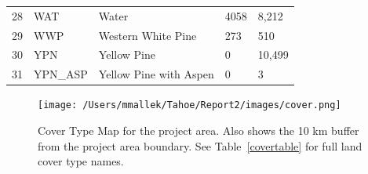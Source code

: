 \begin{table}[!htbp]
\begin{tabular}{@{}lllll@{}}
28                                                          & WAT                                                                & Water                                        & 4058  		                                              & 8,212                                                      \\
\rowcolor[HTML]{CAD6BA} 
29                                                          & WWP                                                                & Western White Pine                           & 273   		                                              & 510                                                        \\
30                                                          & YPN                                                                & Yellow Pine                                  & 0     		                                              & 10,499                                                     \\
\rowcolor[HTML]{CAD6BA} 
31                                                          & YPN\_ASP                                                           & Yellow Pine with Aspen                       & 0     		                                              & 3                                                          \\ \bottomrule
\end{tabular}
\end{table}
\normalsize


\begin{figure}[!htbp]
\centering
\texttt{[image: /Users/mmallek/Tahoe/Report2/images/cover.png]}
\caption{Cover Type Map for the project area. Also shows the 10 km buffer from the project area boundary. See Table~\ref{covertable} for full land cover type names.} 
\label{covermap}
\end{figure}


